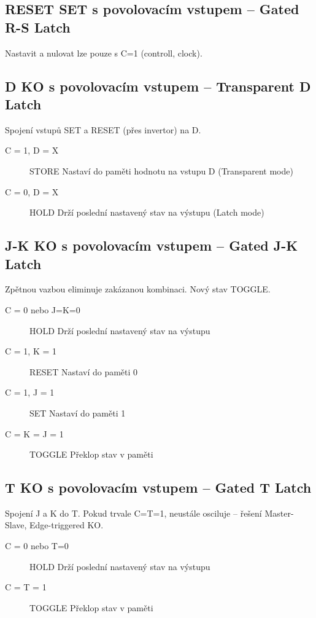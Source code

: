 \documentclass[a4wide]{report}
\begin{document}
\subsection{RESET SET s povolovacím vstupem -- Gated R-S Latch}

Nastavit a nulovat lze pouze s C=1 (controll, clock).

\subsection{D KO s povolovacím vstupem -- Transparent D Latch}

Spojení vstupů SET a RESET (přes invertor) na D.

\begin{description}
	\item[C = 1, D = X] STORE Nastaví do paměti hodnotu na vstupu D (Transparent mode)
	\item[C = 0, D = X] HOLD Drží poslední nastavený stav na výstupu (Latch mode)
\end{description}

\subsection{J-K KO s povolovacím vstupem -- Gated J-K Latch}

Zpětnou vazbou eliminuje zakázanou kombinaci. Nový stav TOGGLE.

\begin{description}
	\item[C = 0 nebo J=K=0] HOLD Drží poslední nastavený stav na výstupu
	\item[C = 1, K = 1] RESET Nastaví do paměti 0
	\item[C = 1, J = 1] SET Nastaví do paměti 1
	\item[C = K = J = 1] TOGGLE Překlop stav v paměti
\end{description}

\subsection{T KO s povolovacím vstupem -- Gated T Latch}

Spojení J a K do T. Pokud trvale C=T=1, neustále osciluje -- řešení Master-Slave, Edge-triggered KO.

\begin{description}
	\item[C = 0 nebo T=0] HOLD Drží poslední nastavený stav na výstupu
	\item[C = T = 1] TOGGLE Překlop stav v paměti
\end{description}
\end{document}

